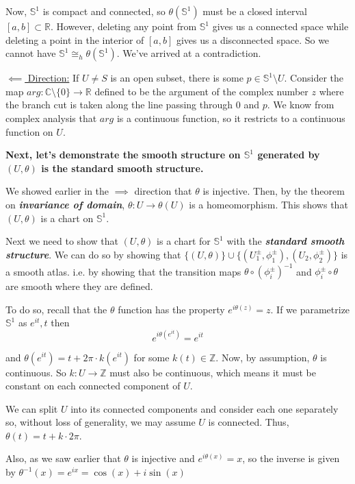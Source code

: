 \documentclass{article}
\newcommand{\R}{\mathbb{R}}
\newcommand{\C}{\mathbb{C}}
\newcommand{\sphere}{\mathbb{S}}
\begin{document}
Now, $\sphere^1$ is compact and connected, so $\theta(\sphere^1)$ must be a closed interval $[a, b] \subset \R$. However, deleting any point from $\sphere^1$ gives us a connected space while deleting a point in the interior of $[a, b]$ gives us a disconnected space. So we cannot have $\sphere^1 \cong_{h} \theta(\sphere^1)$. We've arrived at a contradiction.

\vskip 0.5cm
\underline{$\impliedby$ Direction:}
If $U \neq S$ is an open subset, there is some $p \in \mathbb{S}^1 \setminus U$. Consider the map $arg : \C \setminus \{0\} \rightarrow \R$ defined to be the argument of the complex number $z$ where the branch cut is taken along the line passing through $0$ and $p$. We know from complex analysis that $arg$ is a continuous function, so it restricts to a continuous function on $U$.

\vskip 0.5cm
\textbf{Next, let's demonstrate the smooth structure on $\mathbb{S}^1$ generated by $(U, \theta)$ is the standard smooth structure.}

\vskip 0.25cm
We showed earlier in the $\implies$ direction that $\theta$ is injective. Then, by the theorem on \emph{\textbf{invariance of domain}}, $\theta : U \rightarrow \theta(U)$ is a homeomorphism. This shows that $(U, \theta)$ is a chart on $\mathbb{S}^1$.

\vskip 0.25cm
Next we need to show that $(U, \theta)$ is a chart for $\mathbb{S}^1$ with the \textbf{\emph{standard smooth structure}}. We can do so by showing that $\{(U, \theta)\} \cup \{ (U_1^{\pm}, \phi_1^{\pm}), (U_2, \phi_2^{\pm}) \}$ is a smooth atlas. i.e. by showing that the transition maps $\theta \circ (\phi_i^{\pm})^{-1}$ and $\phi_i^{\pm} \circ \theta$ are smooth where they are defined.

\vskip 0.25cm
To do so, recall that the $\theta$ function has the property $e^{i \theta(z)} = z$. If we parametrize $\mathbb{S}^1$ as $e^{it}, t$ then 
\[ e^{i \theta \left(e^{it}\right)} = e^{it} \]

and $\theta(e^{it}) = t + 2\pi \cdot k(e^{it})$ for some $k(t) \in \mathbb{Z}$. Now, by assumption, $\theta$ is continuous. So $k : U \rightarrow \mathbb{Z}$ must also be continuous, which means it must be constant on each connected component of $U$. 

\vskip 0.25cm
We can split $U$ into its connected components and consider each one separately so, without loss of generality, we may assume $U$ is connected. Thus, $\theta(t) = t + k \cdot 2\pi $.

\vskip 0.25cm
Also, as we saw earlier that $\theta$ is injective and $e^{i \theta(x)} = x$, so the inverse is given by $\theta^{-1}(x) = e^{ix} = \cos(x) + i\sin(x)$
\end{document}
